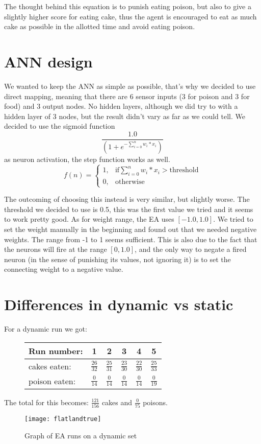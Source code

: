 \documentclass[12pt, a4paper]{article}
\begin{document}
The thought behind this equation is to punish eating poison, but also to give a slightly higher score for eating cake, thus the agent is encouraged to eat as much cake as possible in the allotted time and avoid eating poison. 

\section{ANN design}
We wanted to keep the ANN as simple as possible, that's why we decided to use direct mapping, meaning that there are 6 sensor inputs (3 for poison and 3 for food) and 3 output nodes. No hidden layers, although we did try to with a hidden layer of 3 nodes, but the result didn't vary as far as we could tell.
We decided to use the sigmoid function $$ \frac{1.0}
{(1+e^ {-\sum_{i = 0}^{n}{w_i * x_i}})} $$
as neuron activation, the step function works as well.  
$$
f(n) =
\begin{cases}
1, & \text{if} \sum_{i = 0}^{n}{w_i * x_i}>\text{threshold} \\
0, & \text{otherwise }
\end{cases}
$$

The outcoming of choosing this instead is very similar, but slightly worse.
The threshold we decided to use is 0.5, this was the first value we tried and it seems to work pretty good. As for weight range, the EA uses $[-1.0, 1.0]$. We tried to set the weight manually in the beginning and found out that we needed negative weights. The range from -1 to 1 seems sufficient. This is also due to the fact that the neurons will fire at the range $[0,1.0]$, and the only way to negate a fired neuron (in the sense of punishing its values, not ignoring it) is to set the connecting weight to a negative value.

\section{Differences in dynamic vs static}
For a dynamic run we got:\\
\begin{figure}[H]
	\begin{center}
	\begin{tabular}{l| c|c|c|c|c}
	Run number: &  1&2 &3 &4 &5 \\ \hline
cakes eaten: &$ \frac{26}{32} $ &$ \frac{25}{31} $ &$ \frac{23}{30} $ &$ \frac{22}{30} $ &$ \frac{25}{33} $ \\ \hline
poison eaten: &$ \frac{0}{14} $ &$ \frac{0}{14} $ &$ \frac{0}{14} $ &$ \frac{0}{14} $ &$ \frac{0}{19} $ \\ \hline
	\end{tabular}
	\end{center}
\end{figure}
The total for this becomes: $ \frac{121}{156} $ cakes and $ \frac{0}{75} $ poisons.  
\begin{figure}[H]
\texttt{[image: flatlandtrue]}
\caption{Graph of EA runs on a dynamic set}
\end{figure}
\end{document}
